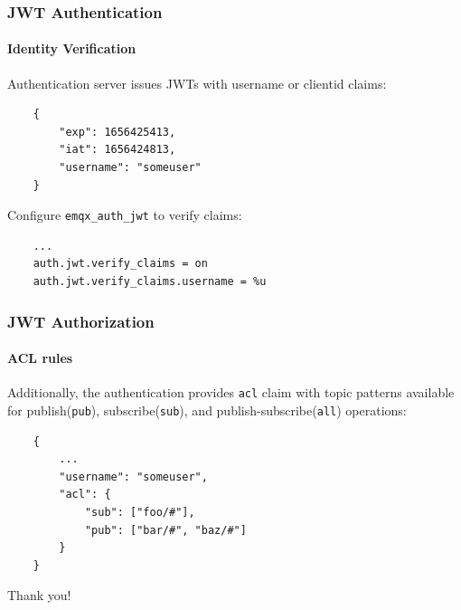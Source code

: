 \documentclass{beamer}
\begin{document}
\begin{frame}[fragile]
    \frametitle{JWT Authentication}
    \framesubtitle{Identity Verification}

    Authentication server issues JWTs with username or clientid claims:
    \begin{lstlisting}
    {
        "exp": 1656425413,
        "iat": 1656424813,
        "username": "someuser"
    }
    \end{lstlisting}
    Configure \lstinline{emqx_auth_jwt} to verify claims:
    \begin{lstlisting}
    ...
    auth.jwt.verify_claims = on
    auth.jwt.verify_claims.username = %u
    \end{lstlisting}
\end{frame}

\begin{frame}[fragile]
    \frametitle{JWT Authorization}
    \framesubtitle{ACL rules}

    Additionally, the authentication provides \lstinline{acl} claim with topic patterns
    available for publish(\lstinline{pub}), subscribe(\lstinline{sub}), and publish-subscribe(\lstinline{all}) operations:
    \begin{lstlisting}
    {
        ...
        "username": "someuser",
        "acl": {
            "sub": ["foo/#"],
            "pub": ["bar/#", "baz/#"]
        }
    }
    \end{lstlisting}
\end{frame}

\begin{frame}
    \begin{center}
        Thank you!
    \end{center}
\end{frame}
\end{document}
